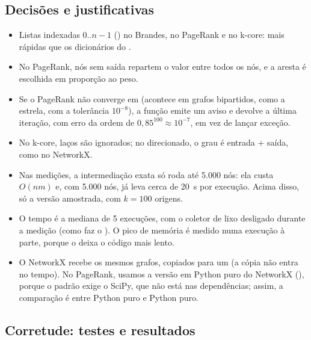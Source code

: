 \subsection{Decisões e justificativas}
\begin{itemize}[leftmargin=*]
  \item Listas indexadas $0..n-1$ () no Brandes, no PageRank e no k-core: mais rápidas que os dicionários do .
  \item No PageRank, nós sem saída repartem o valor entre todos os nós, e a aresta é escolhida em proporção ao peso.
  \item Se o PageRank não converge em  (acontece em grafos bipartidos, como a estrela, com a tolerância $10^{-8}$), a função emite um aviso e devolve a última iteração, com erro da ordem de $0{,}85^{100} \approx 10^{-7}$, em vez de lançar exceção.
  \item No k-core, laços são ignorados; no direcionado, o grau é entrada + saída, como no NetworkX.
  \item Nas medições, a intermediação exata só roda até 5.000 nós: ela custa $O(nm)$ e, com 5.000 nós, já leva cerca de 20~s por execução. Acima disso, só a versão amostrada, com $k = 100$ origens.
  \item O tempo é a mediana de 5 execuções, com o coletor de lixo desligado durante a medição (como faz o ). O pico de memória é medido numa execução à parte, porque o  deixa o código mais lento.
  \item O NetworkX recebe os mesmos grafos, copiados para um  (a cópia não entra no tempo). No PageRank, usamos a versão em Python puro do NetworkX (), porque o  padrão exige o SciPy, que não está nas dependências; assim, a comparação é entre Python puro e Python puro.
\end{itemize}

\subsection{Corretude: testes e resultados}

